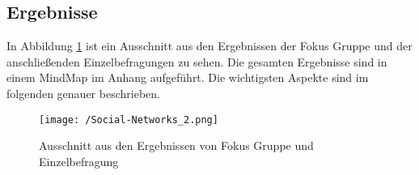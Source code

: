\documentclass{sigchi}
\begin{document}
\subsection{Ergebnisse}
\label{Ergebnisse}
In Abbildung \ref{fig:MindMap2} ist ein Ausschnitt aus den Ergebnissen der Fokus Gruppe und der anschließenden Einzelbefragungen zu sehen. Die gesamten Ergebnisse sind in einem MindMap im Anhang aufgeführt. Die wichtigsten Aspekte sind im folgenden genauer beschrieben. 
\begin{figure}[htbp]
	\texttt{[image: /Social-Networks\_2.png]}
	\caption{Ausschnitt aus den Ergebnissen von Fokus Gruppe und Einzelbefragung}
	\label{fig:MindMap2}
\end{figure}
\end{document}
